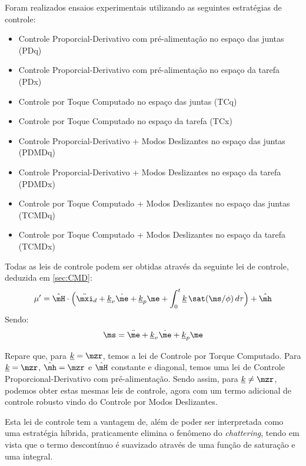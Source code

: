\documentclass[]{politex}
\begin{document}
Foram realizados ensaios experimentais utilizando as seguintes estratégias de controle:

\begin{itemize}
\item Controle Proporcial-Derivativo com pré-alimentação no espaço das juntas (PDq)
\item Controle Proporcial-Derivativo com pré-alimentação no espaço da tarefa (PDx)
\item Controle por Toque Computado no espaço das juntas (TCq)
\item Controle por Toque Computado no espaço da tarefa (TCx)
\item Controle Proporcial-Derivativo + Modos Deslizantes no espaço das juntas (PDMDq)
\item Controle Proporcial-Derivativo + Modos Deslizantes no espaço da tarefa (PDMDx)
\item Controle por Toque Computado + Modos Deslizantes no espaço das juntas (TCMDq)
\item Controle por Toque Computado + Modos Deslizantes no espaço da tarefa (TCMDx)
\end{itemize}

Todas as leis de controle podem ser obtidas através da seguinte lei de controle, deduzida em \ref{sec:CMD}:
\begin{equation} \label{eq:LeiTCMD}
\mu' = \hat{\mH} \cdot \Big(\ddot{\mxi}_d + \underline{k}_v \dot{\me} + \underline{k}_p \me + \int_0^t \underline{k} \, \sat(\ms/\phi)\,d \tau \Big) + \hat{\mh}
\end{equation}
Sendo:
\begin{equation}
\ms = \ddot{\me} + \underline{k}_v \dot{\me} + \underline{k}_p \me
\end{equation}

Repare que, para $\underline{k} = \mzr$, temos a lei de Controle por Torque Computado. Para $\underline{k} = \mzr$, $\hat{\mh} = \mzr$ e $\hat{\mH}$ constante e diagonal, temos uma lei de Controle Proporcional-Derivativo com pré-alimentação. Sendo assim, para $\underline{k} \neq \mzr$, podemos obter estas mesmas leis de controle, agora com um termo adicional de controle robusto vindo do Controle por Modos Deslizantes.

Esta lei de controle tem a vantagem de, além de poder ser interpretada como uma estratégia híbrida, praticamente elimina o fenômeno do \emph{chattering}, tendo em vista que o termo descontínuo é suavizado através de uma função de saturação e uma integral.
\end{document}
